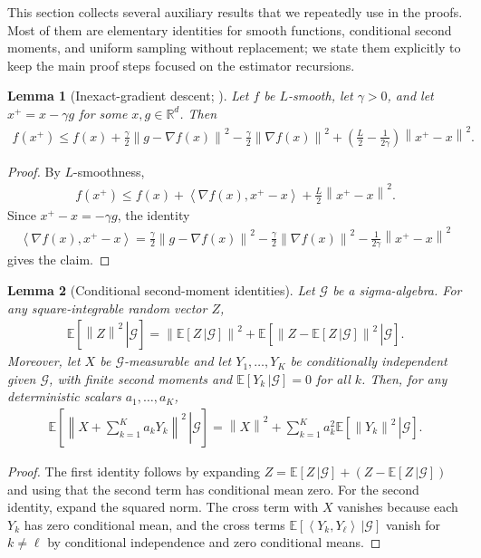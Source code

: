 \documentclass{article}
\newcommand{\bb}{\mathbb}
\newcommand{\inner}[2]{\left\langle #1, #2 \right\rangle}
\newcommand{\R}{\bb R}
\newcommand{\sqn}[1]{\left\| #1 \right\|^2}
\newcommand{\Expb}[2]{\mathbb{E}\!\left[\left. #1\,\right|#2 \right]}
\theoremstyle{plain}
\newtheorem{lemma}{Lemma}
\begin{document}
This section collects several auxiliary results that we repeatedly use in the proofs.
Most of them are elementary identities for smooth functions, conditional second moments, and uniform sampling without replacement; we state them explicitly to keep the main proof steps focused on the estimator recursions.

\begin{lemma}[Inexact-gradient descent; \citep{li21}]\label{lem:inexact_descent}
Let $f$ be $L$-smooth, let $\gamma>0$, and let $x^+=x-\gamma g$ for some $x,g\in\R^d$. Then
\begin{align*}
f(x^+)
\leq f(x)
+\frac{\gamma}{2}\sqn{g-\nabla f(x)}
-\frac{\gamma}{2}\sqn{\nabla f(x)}
+\left(\frac{L}{2}-\frac{1}{2\gamma}\right)\sqn{x^+-x}.
\end{align*}
\end{lemma}
\begin{proof}
By $L$-smoothness,
\begin{align*}
f(x^+)
\leq f(x)+\inner{\nabla f(x)}{x^+-x}+\frac{L}{2}\sqn{x^+-x}.
\end{align*}
Since $x^+-x=-\gamma g$, the identity
\begin{align*}
\inner{\nabla f(x)}{x^+-x}
=\frac{\gamma}{2}\sqn{g-\nabla f(x)}
-\frac{\gamma}{2}\sqn{\nabla f(x)}
-\frac{1}{2\gamma}\sqn{x^+-x}
\end{align*}
gives the claim.
\end{proof}

\begin{lemma}[Conditional second-moment identities]\label{lem:conditional_second_moment}
Let $\mathcal{G}$ be a sigma-algebra. For any square-integrable random vector $Z$,
\begin{align}
\Expb{\sqn{Z}}{\mathcal{G}}
=\sqn{\Expb{Z}{\mathcal{G}}}
+\Expb{\sqn{Z-\Expb{Z}{\mathcal{G}}}}{\mathcal{G}}.
\label{eq:conditional_variance_decomposition}
\end{align}
Moreover, let $X$ be $\mathcal{G}$-measurable and let $Y_1,\ldots,Y_K$ be conditionally independent given $\mathcal{G}$, with finite second moments and $\Expb{Y_k}{\mathcal{G}}=0$ for all $k$. Then, for any deterministic scalars $a_1,\ldots,a_K$,
\begin{align}
\Expb{\sqn{X+\sum_{k=1}^K a_kY_k}}{\mathcal{G}}
=\sqn{X}+\sum_{k=1}^K a_k^2\Expb{\sqn{Y_k}}{\mathcal{G}}.
\label{eq:conditional_zero_mean_sum}
\end{align}
\end{lemma}
\begin{proof}
The first identity follows by expanding
$Z=\Expb{Z}{\mathcal{G}}+\left(Z-\Expb{Z}{\mathcal{G}}\right)$ and using that the second term has conditional mean zero.
For the second identity, expand the squared norm. The cross term with $X$ vanishes because each $Y_k$ has zero conditional mean, and the cross terms
$\Expb{\inner{Y_k}{Y_\ell}}{\mathcal{G}}$ vanish for $k\neq \ell$ by conditional independence and zero conditional means.
\end{proof}
\end{document}
